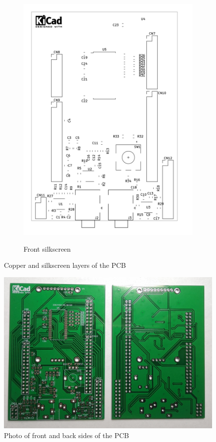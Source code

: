 \documentclass[a4paper,twoside,12pt]{book}
\begin{document}
\begin{figure}[H]
\begin{subfigure}[h]{0.3\textwidth}
        \includegraphics[width=\textwidth]{images/Board_silkscreen}
        \label{fig:board3}
        \caption{Front silkscreen}
    \end{subfigure}
    \caption{Copper and silkscreen layers of the PCB}
    \label{fig:board}
\end{figure}

\begin{figure}[H]
    \centering
    \includegraphics[width=\textwidth]{images/photo_boards}
    \caption{Photo of front and back sides of the PCB}
    \label{fig:photo_boards}
\end{figure}
\end{document}
